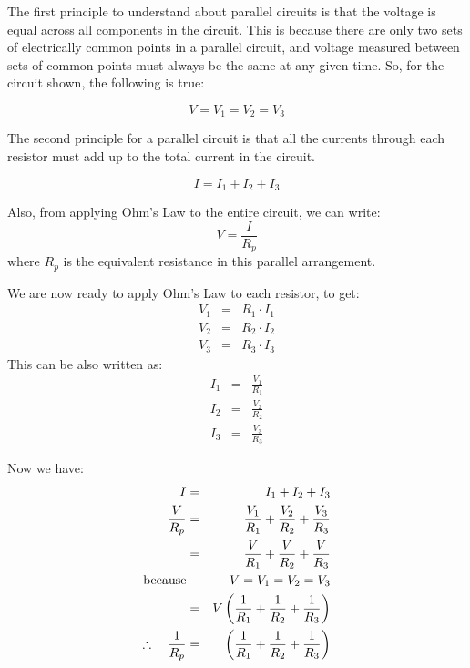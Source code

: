 The first principle to understand about parallel circuits is that the
voltage is equal across all components in the circuit. This is because there are only two sets of electrically common points in a parallel circuit, and voltage measured between sets of common points must always be the same at any given time. So, for the circuit shown, the following is true: 

\begin{equation*}
\label{eq:parallelR:V}
V=V_1=V_2=V_3
\end{equation*}

The second principle for a parallel circuit is that all the currents through each resistor must add up to the total current in the circuit. 

\begin{equation*}
\label{eq:parallelR:I}
I=I_1+I_2+I_3
\end{equation*}

Also, from applying Ohm's Law to the entire circuit, we can write:
\begin{equation*}
V=\frac{I}{R_p}
\end{equation*}
where $R_p$ is the equivalent resistance in this parallel arrangement.

We are now ready to apply Ohm's Law to each resistor, to get:
\begin{eqnarray*}
V_1&=&R_1\cdot I_1\\
V_2&=&R_2\cdot I_2\\
V_3&=&R_3\cdot I_3
\end{eqnarray*}
This can be also written as:
\begin{eqnarray*}
I_1&=&\frac{V_1}{R_1}\\
I_2&=&\frac{V_2}{R_2}\\
I_3&=&\frac{V_3}{R_3}
\end{eqnarray*}

Now we have:
\begin{eqnarray*}
I&=&I_1+I_2+I_3\\
\frac{V}{R_p}&=&\frac{V_1}{R_1}+\frac{V_2}{R_2}+\frac{V_3}{R_3}\\
&=&\frac{V}{R_1}+\frac{V}{R_2}+\frac{V}{R_3}\\ 
\rm{because} & & V=V_1=V_2=V_3 \\
&=&V\left(\frac{1}{R_1}+\frac{1}{R_2}+\frac{1}{R_3}\right)\\
\therefore \quad \frac{1}{R_p}&=&\left(\frac{1}{R_1}+\frac{1}{R_2}+\frac{1}{R_3}\right)
\end{eqnarray*}

